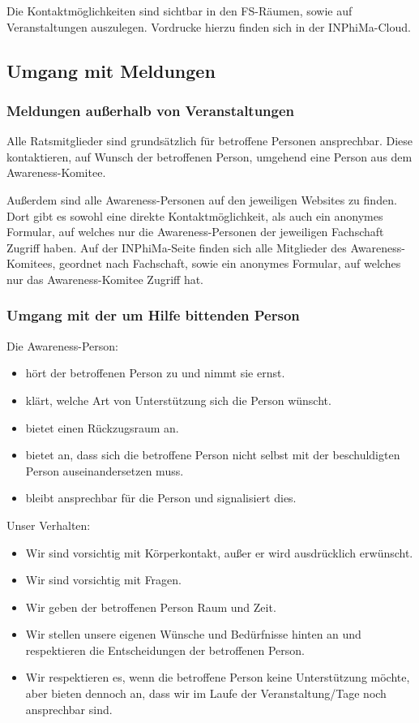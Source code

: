 \documentclass{article}
\begin{document}
Die Kontaktmöglichkeiten sind sichtbar in den FS-Räumen, sowie auf Veranstaltungen auszulegen. Vordrucke hierzu finden sich in der INPhiMa-Cloud. 

\subsection{Umgang mit Meldungen}
\subsubsection{Meldungen außerhalb von Veranstaltungen}
Alle Ratsmitglieder sind grundsätzlich für betroffene Personen ansprechbar. Diese kontaktieren, auf Wunsch der betroffenen Person, umgehend eine Person aus dem Awareness-Komitee. 

Außerdem sind alle Awareness-Personen auf den jeweiligen Websites zu finden. Dort gibt es sowohl eine direkte Kontaktmöglichkeit, als auch ein anonymes Formular, auf welches nur die Awareness-Personen der jeweiligen Fachschaft Zugriff haben. Auf der INPhiMa-Seite finden sich alle Mitglieder des Awareness-Komitees, geordnet nach Fachschaft, sowie ein anonymes Formular, auf welches nur das Awareness-Komitee Zugriff hat.

\subsubsection{Umgang mit der um Hilfe bittenden Person}

Die Awareness-Person:
\begin{itemize}
    \item hört der betroffenen Person zu und nimmt sie ernst.
    \item klärt, welche Art von Unterstützung sich die Person wünscht.
    \item bietet einen Rückzugsraum an.
    \item bietet an, dass sich die betroffene Person nicht selbst mit der beschuldigten Person auseinandersetzen muss.
    \item bleibt ansprechbar für die Person und signalisiert dies.
\end{itemize}
Unser Verhalten:
\begin{itemize}
    \item Wir sind vorsichtig mit Körperkontakt, außer er wird ausdrücklich erwünscht.
    \item Wir sind vorsichtig mit Fragen.
    \item Wir geben der betroffenen Person Raum und Zeit.
    \item Wir stellen unsere eigenen Wünsche und Bedürfnisse hinten an und respektieren die Entscheidungen der betroffenen Person.
    \item Wir respektieren es, wenn die betroffene Person keine Unterstützung möchte, aber bieten dennoch an, dass wir im Laufe der Veranstaltung/Tage noch ansprechbar sind.
\end{itemize}
\end{document}
